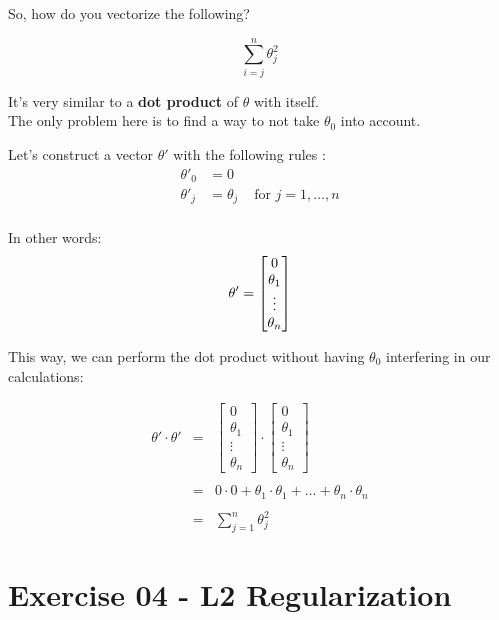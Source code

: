 \documentclass[]{article}
\begin{document}
So, how do you vectorize the following?

\large

\[
\sum_{i = j}^n \theta_j^2
\] \normalsize

It's very similar to a \textbf{dot product} of \(\theta\) with itself.\\
The only problem here is to find a way to not take \(\theta_0\) into
account.

Let's construct a vector \(\theta'\) with the following rules : \large
\[
\begin{matrix}
\theta'_0 & = 0 &\\
\theta'_j & =  \theta_j & \text{ for } j = 1, \dots, n\\    
\end{matrix}
\] \normalsize

In other words: \large \[
\\
\theta' = \begin{bmatrix}
  0 \\
  \theta_1 \\
  \vdots \\
  \theta_n
\end{bmatrix}
\] \normalsize

This way, we can perform the dot product without having \(\theta_0\)
interfering in our calculations:

\large

\[
\begin{matrix}
\theta' \cdot \theta' & = & 
\begin{bmatrix}
  0 \\
  \theta_1 \\
  \vdots \\
  \theta_n
\end{bmatrix} \cdot \begin{bmatrix}
  0 \\
  \theta_1 \\
  \vdots \\
  \theta_n
\end{bmatrix} \\ 
\\
& = & 0 \cdot 0 + \theta_1 \cdot \theta_1 + \dots + \theta_n \cdot \theta_n \\ 
\\
& = & \sum_{j= 1}^n \theta_j^2
\end{matrix}
\] \normalsize \clearpage

\hypertarget{exercise-04---l2-regularization-1}{%
\section{Exercise 04 - L2
Regularization}\label{exercise-04---l2-regularization-1}}
\end{document}
